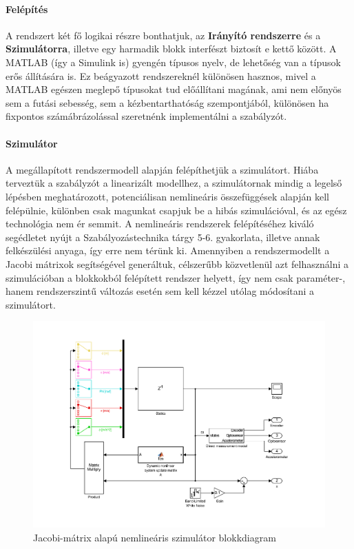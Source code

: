 \paragraph{Felépítés}

A rendszert két fő logikai részre bonthatjuk, az \textbf{Irányító rendszerre} és a \textbf{Szimulátorra}, illetve egy harmadik blokk interfészt biztosít e kettő között. A MATLAB (így a Simulink is) gyengén típusos nyelv, de lehetőség van a típusok erős állítására is. Ez beágyazott rendszereknél különösen hasznos, mivel a MATLAB egészen meglepő típusokat tud előállítani magának, ami nem előnyös sem a futási sebesség, sem a kézbentarthatóság szempontjából, különösen ha fixpontos számábrázolással szeretnénk implementálni a szabályzót.

\paragraph{Szimulátor}

A megállapított rendszermodell alapján felépíthetjük a szimulátort. Hiába terveztük a szabályzót a linearizált modellhez, a szimulátornak mindig a legelső lépésben meghatározott, potenciálisan nemlineáris összefüggések alapján kell felépülnie, különben csak magunkat csapjuk be a hibás szimulációval, és az egész technológia nem ér semmit.
A nemlineáris rendszerek felépítéséhez kiváló segédletet nyújt a Szabályozástechnika tárgy 5-6. gyakorlata, illetve annak felkészülési anyaga\cite[p.~319-354]{szabtech}, így erre nem térünk ki. Amennyiben a rendszermodellt a Jacobi mátrixok segítségével generáltuk, célszerűbb közvetlenül azt felhasználni a szimulációban a blokkokból felépített rendszer helyett, így nem csak paraméter-, hanem rendszerszintű változás esetén sem kell kézzel utólag módosítani a szimulátort.

\begin{figure}[!ht]
    \centering
    \includegraphics[width=\linewidth]{img/sys}
    \centering
    \vspace{-30pt}
    \caption{Jacobi-mátrix alapú nemlineáris szimulátor blokkdiagram}
    \label{fig:model}
\end{figure}

